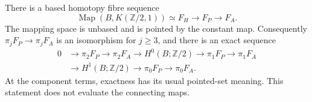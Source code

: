 \begin{theorem}\label{thm:four-dimensional-comparison-fibres}
There is a based homotopy fibre sequence
\begin{equation}\label{eq:four-dimensional-comparison-fibre-sequence}
 \operatorname{Map}(B,K(\mathbb Z/2,1))
       \simeq F_H\longrightarrow F_P\longrightarrow F_A.
\end{equation}
The mapping space is unbased and is pointed by the constant map.
Consequently $\pi_jF_P\to\pi_jF_A$ is an isomorphism for $j\geq3$,
and there is an exact sequence
\begin{equation}\label{eq:four-dimensional-comparison-low-sequence}
\begin{aligned}
0&\longrightarrow\pi_2F_P\longrightarrow\pi_2F_A
 \longrightarrow H^0(B;\mathbb Z/2)
 \longrightarrow\pi_1F_P\longrightarrow\pi_1F_A\\
 &\longrightarrow H^1(B;\mathbb Z/2)
 \longrightarrow\pi_0F_P\longrightarrow\pi_0F_A.
\end{aligned}
\end{equation}
At the component terms, exactness has its usual pointed-set meaning.
This statement does not evaluate the connecting maps.
\end{theorem}

